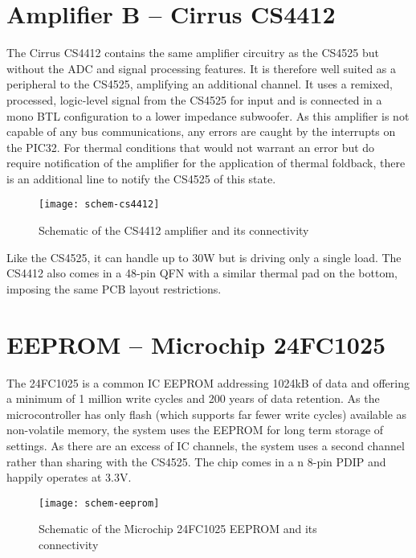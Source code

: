 \section{Amplifier B -- Cirrus CS4412}
The Cirrus CS4412 contains the same amplifier circuitry as the CS4525 but without the ADC and signal processing features. It is therefore well suited as a peripheral to the CS4525, amplifying an additional channel. It uses a remixed, processed, logic-level signal from the CS4525 for input and is connected in a mono BTL configuration to a lower impedance subwoofer. As this amplifier is not capable of any bus communications, any errors are caught by the interrupts on the PIC32. For thermal conditions that would not warrant an error but do require notification of the amplifier for the application of thermal foldback, there is an additional line to notify the CS4525 of this state. 
\begin{figure}[H]
	\centering
	\texttt{[image: schem-cs4412]}
	\caption[Schematic -- Cirrus CS4412]%
	{Schematic of the CS4412 amplifier and its connectivity}
\end{figure}
Like the CS4525, it can handle up to 30W but is driving only a single load. The CS4412 also comes in a 48-pin QFN with a similar thermal pad on the bottom, imposing the same PCB layout restrictions.

\section{EEPROM -- Microchip 24FC1025}
\label{sec:eeprom}
The 24FC1025 is a common IC EEPROM addressing 1024kB of data and offering a minimum of 1 million write cycles and 200 years of data retention. As the microcontroller has only flash (which supports far fewer write cycles) available as non-volatile memory, the system uses the EEPROM for long term storage of settings. As there are an excess of IC channels, the system uses a second channel rather than sharing with the CS4525. The chip comes in a n 8-pin PDIP and happily operates at 3.3V. 
\begin{figure}[H]
	\centering
	\texttt{[image: schem-eeprom]}
	\caption[Schematic -- Microchip 24FC12025]%
	{Schematic of the Microchip 24FC1025 EEPROM and its connectivity}
\end{figure}


